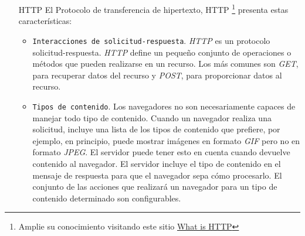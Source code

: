 \begin{itemize}
		En general, las \texttt{URL HTTP} tienen el siguiente formato, ver figura \ref{fig:Cou-Fig3}:
	
	\begin{figure}%
		\texttt{[image: Coulouris-Fig3.png]}
		\caption{ Formato de los URL. Tomado de \CO }
		\label{fig:Cou-Fig3}
	\end{figure}
	
	donde los elementos entre corchetes son opcionales. Una\texttt{ URL HTTP} completa siempre comienza con cadena \textit{http: //} seguida de un nombre de servidor, expresado como un sistema de nombres de dominio (DNS). Opcionalmente, el nombre \gls{DNS} del servidor va seguido del número del puerto en el que el servidor escucha las solicitudes,  el puerto 80 por 	defecto. Luego viene un nombre de ruta opcional del recurso del servidor. Si esto está ausente entonces se requiere la página web predeterminada del servidor. Finalmente, la URL termina opcionalmente en una consulta. 
	
	
	\begin{figure}
		\texttt{[image: Coulouris-WebServer.png]}
		\caption{Ejemplo de Web Server y Web Browser. Tomado de \CO}
		\label{fig:WebServer-Exa}
	\end{figure}
	
	\item[{HTTP}]  El Protocolo de transferencia de hipertexto, \gls{HTTP} \footnote{Amplie su conocimiento visitando este sitio \href{https://www.w3schools.com/whatis/whatis_http.asp} {What is HTTP}  } presenta estas caracter\'isticas:
	
	\begin{itemize}
		\item \texttt{Interacciones de solicitud-respuesta}.  \textit{HTTP} es un \gls{protocolo solicitud-respuesta}.  \textit{HTTP} define un pequeño conjunto de operaciones o métodos que pueden 	realizarse en un recurso. Los más comunes son \textit{GET}, para recuperar datos del recurso y \textit{POST}, para proporcionar datos al recurso.
		
		\item \texttt{Tipos de contenido}. Los navegadores no son necesariamente capaces de manejar todo tipo de
		contenido. Cuando un navegador realiza una solicitud, incluye una lista de los tipos de contenido que prefiere, por ejemplo, en principio, puede mostrar imágenes en formato \textit{GIF} 		
		pero no en formato \textit{JPEG}. El servidor puede tener esto en cuenta cuando devuelve contenido al navegador. El servidor incluye el tipo de contenido en el mensaje de respuesta para que el navegador sepa cómo procesarlo. El conjunto de las acciones que realizará un navegador para un tipo de contenido determinado son configurables.
		

\end{itemize}
\end{itemize}
